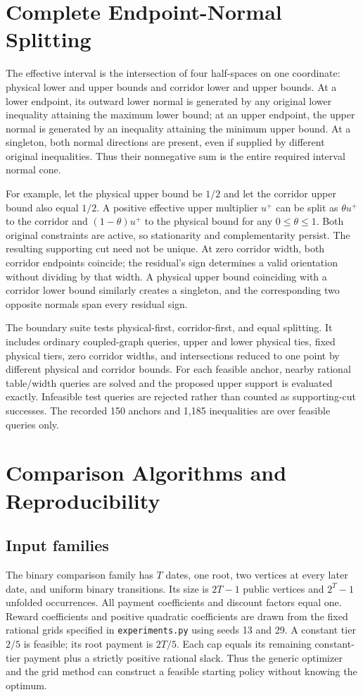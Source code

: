 \section{Complete Endpoint-Normal Splitting}\label{ec:normals}
The effective interval is the intersection of four half-spaces on one coordinate: physical lower and upper bounds and corridor lower and upper bounds. At a lower endpoint, its outward lower normal is generated by any original lower inequality attaining the maximum lower bound; at an upper endpoint, the upper normal is generated by an inequality attaining the minimum upper bound. At a singleton, both normal directions are present, even if supplied by different original inequalities. Thus their nonnegative sum is the entire required interval normal cone.

For example, let the physical upper bound be $1/2$ and let the corridor upper bound also equal $1/2$. A positive effective upper multiplier $u^+$ can be split as $\theta u^+$ to the corridor and $(1-\theta)u^+$ to the physical bound for any $0\leq\theta\leq1$. Both original constraints are active, so stationarity and complementarity persist. The resulting supporting cut need not be unique. At zero corridor width, both corridor endpoints coincide; the residual's sign determines a valid orientation without dividing by that width. A physical upper bound coinciding with a corridor lower bound similarly creates a singleton, and the corresponding two opposite normals span every residual sign.

The boundary suite tests physical-first, corridor-first, and equal splitting. It includes ordinary coupled-graph queries, upper and lower physical ties, fixed physical tiers, zero corridor widths, and intersections reduced to one point by different physical and corridor bounds. For each feasible anchor, nearby rational table/width queries are solved and the proposed upper support is evaluated exactly. Infeasible test queries are rejected rather than counted as supporting-cut successes. The recorded 150 anchors and 1,185 inequalities are over feasible queries only.

\section{Comparison Algorithms and Reproducibility}\label{ec:experiments}
\subsection{Input families}
The binary comparison family has $T$ dates, one root, two vertices at every later date, and uniform binary transitions. Its size is $2T-1$ public vertices and $2^T-1$ unfolded occurrences. All payment coefficients and discount factors equal one. Reward coefficients and positive quadratic coefficients are drawn from the fixed rational grids specified in \texttt{experiments.py} using seeds 13 and 29. A constant tier $2/5$ is feasible; its root payment is $2T/5$. Each cap equals its remaining constant-tier payment plus a strictly positive rational slack. Thus the generic optimizer and the grid method can construct a feasible starting policy without knowing the optimum.

